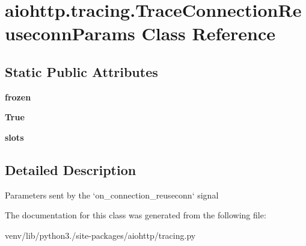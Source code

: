 \hypertarget{classaiohttp_1_1tracing_1_1_trace_connection_reuseconn_params}{}\section{aiohttp.\+tracing.\+Trace\+Connection\+Reuseconn\+Params Class Reference}
\label{classaiohttp_1_1tracing_1_1_trace_connection_reuseconn_params}
\subsection*{Static Public Attributes}
\begin{DoxyCompactItemize}
\item 
\mbox{\label{classaiohttp_1_1tracing_1_1_trace_connection_reuseconn_params_a39c04cac2758e0bd712fc7f2bc431a45}} 
{\bfseries frozen}
\item 
\mbox{\label{classaiohttp_1_1tracing_1_1_trace_connection_reuseconn_params_a050b7a6b6a68f19436eb5195d44ae500}} 
{\bfseries True}
\item 
\mbox{\label{classaiohttp_1_1tracing_1_1_trace_connection_reuseconn_params_a78dbce6a2eb32386be1dafddc3c68f82}} 
{\bfseries slots}
\end{DoxyCompactItemize}


\subsection{Detailed Description}
\begin{DoxyVerb}Parameters sent by the `on_connection_reuseconn` signal\end{DoxyVerb}
 

The documentation for this class was generated from the following file\+:\begin{DoxyCompactItemize}
\item 
venv/lib/python3./site-\/packages/aiohttp/tracing.\+py\end{DoxyCompactItemize}
